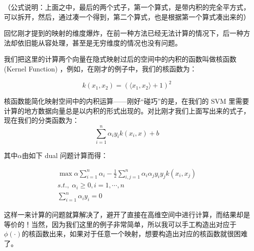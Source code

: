 \documentclass[a4paper,12pt]{article}
\begin{document}
（公式说明：上面之中，最后的两个式子，第一个算式，是带内积的完全平方式，可以拆开，然后，通过凑一个得到，第二个算式，也是根据第一个算式凑出来的）

回忆刚才提到的映射的维度爆炸，在前一种方法已经无法计算的情况下，后一种方法却依旧能从容处理，甚至是无穷维度的情况也没有问题。

我们把这里的计算两个向量在隐式映射过后的空间中的内积的函数叫做核函数 (Kernel Function) ，例如，在刚才的例子中，我们的核函数为：


\begin{equation}
  k(x_1,x_2)=(\langle x_1,x_2\rangle+1)^2
\end{equation}

 核函数能简化映射空间中的内积运算——刚好“碰巧”的是，在我们的 SVM 里需要计算的地方数据向量总是以内积的形式出现的。对比刚才我们上面写出来的式子，现在我们的分类函数为：
 \begin{equation}
   \sum_{i=1}^n\alpha_iy_ik(x_i,x)+b
 \end{equation}

 其中$\alpha$由如下 dual 问题计算而得：

 \begin{equation}
   \begin{split}
     \max\alpha\sum_{i=1}^n\alpha_i-\frac{1}{2}\sum_{i,j=1}^n\alpha_i\alpha_jy_iy_jk(x_i,x_j)\\
     s.t.,\; \alpha_i\geq0,i=1,\cdots,n\\
     \sum_{i=1}^n\alpha_iy_i=0
   \end{split}
 \end{equation}

 这样一来计算的问题就算解决了，避开了直接在高维空间中进行计算，而结果却是等价的！当然，因为我们这里的例子非常简单，所以我可以手工构造出对应于$\phi(\cdot)$的核函数出来，如果对于任意一个映射，想要构造出对应的核函数就很困难了。
\end{document}
